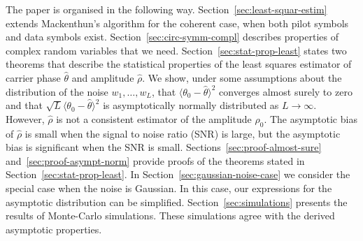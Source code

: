 \documentclass[journal]{IEEEtran}
\begin{document}
The paper is organised in the following way.  Section~\ref{sec:least-squar-estim} extends Mackenthun's algorithm for the coherent case, when both pilot symbols and data symbols exist.  Section~\ref{sec:circ-symm-compl} describes properties of complex random variables that we need.  Section~\ref{sec:stat-prop-least} states two theorems that describe the statistical properties of the least squares estimator of carrier phase $\hat{\theta}$ and amplitude $\hat{\rho}$.  We show, under some assumptions about the distribution of the noise $w_1,\dots,w_L$, that $\langle\theta_0 - \hat{\theta}\rangle^2$ converges almost surely to zero and that $\sqrt{L}\langle\theta_0 - \hat{\theta}\rangle^2$ is asymptotically normally distributed as $L\rightarrow \infty$.  However, $\hat{\rho}$ is not a consistent estimator of the amplitude $\rho_0$.  The asymptotic bias of $\hat{\rho}$ is small when the signal to noise ratio (SNR) is large, but the asymptotic bias is significant when the SNR is small.  Sections~\ref{sec:proof-almost-sure} and~\ref{sec:proof-asympt-norm} provide proofs of the theorems stated in Section~\ref{sec:stat-prop-least}.  In Section~\ref{sec:gaussian-noise-case} we consider the special case when the noise is Gaussian.  In this case, our expressions for the asymptotic distribution can be simplified.  Section~\ref{sec:simulations} presents the results of Monte-Carlo simulations.  These simulations agree with the derived asymptotic properties. 

\end{document}
